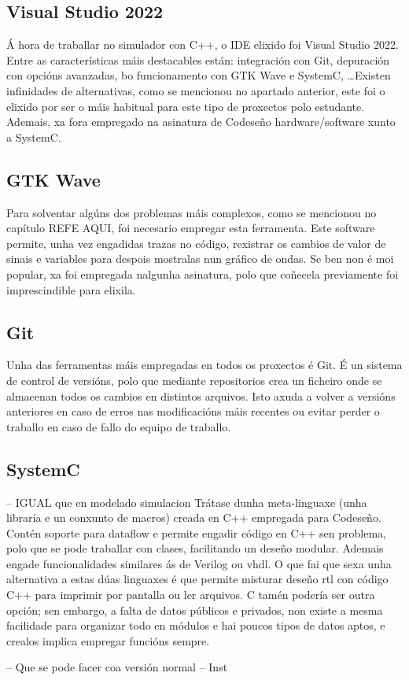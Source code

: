 \subsection{Visual Studio 2022}\label{sec:visual_studio}
Á hora de traballar no simulador con C++, o IDE elixido foi Visual Studio 2022. Entre as características máis destacables están: integración con Git, depuración con opcións avanzadas, bo funcionamento con GTK Wave e SystemC, \dots Existen infinidades de alternativas, como se mencionou no apartado anterior, este foi o elixido por ser o máis habitual para este tipo de proxectos polo estudante. Ademais, xa fora empregado na asinatura de Codeseño \gls{hardware}/\gls{software} xunto a SystemC. 

\subsection{GTK Wave}\label{sec:gtkwave}
Para solventar algúns dos problemas máis complexos, como se mencionou no capítulo REFE AQUI, foi necesario empregar esta ferramenta. Este software permite, unha vez engadidas trazas no código, rexistrar os cambios de valor de sinais e variables para despois mostralas nun gráfico de ondas. Se ben non é moi popular, xa foi empregada nalgunha asinatura, polo que  coñecela previamente foi imprescindible para elixila.

\subsection{Git}\label{sec:git}
Unha das ferramentas máis empregadas en todos os proxectos é Git. É un sistema de control de versións, polo que mediante repositorios crea un ficheiro onde se almacenan todos os cambios en distintos arquivos. Isto axuda a volver a versións anteriores en caso de erros nas modificacións máis recentes ou evitar perder o traballo en caso de fallo do equipo de traballo.


\subsection{SystemC}\label{sec:imp_systemC}
-- IGUAL que en modelado simulacion
Trátase dunha meta-linguaxe (unha libraría e un conxunto de macros) creada en C++ empregada para Codeseño. Contén soporte para dataflow e permite engadir código en C++ sen problema, polo que se pode traballar con clases, facilitando un deseño modular. Ademais engade funcionalidades similares ás de Verilog ou \acrshort{vhdl}. O que fai que sexa unha alternativa a estas dúas linguaxes é que permite misturar deseño \acrshort{rtl} con código C++ para imprimir por pantalla ou ler arquivos. C tamén podería ser outra opción; sen embargo, a falta de datos públicos e privados, non existe a mesma facilidade para organizar todo en módulos e hai poucos tipos de datos aptos, e crealos implica empregar funcións sempre.


-- Que se pode facer coa versión normal
-- Inst


